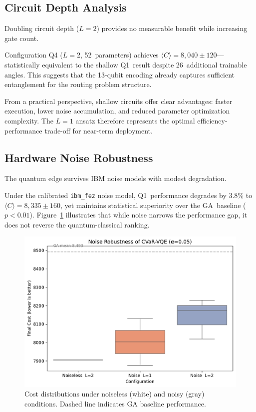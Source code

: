 \subsection{Circuit Depth Analysis}

Doubling circuit depth ($L=2$) provides no measurable benefit while increasing 
gate count.


Configuration Q4 ($L=2$, 52~parameters) achieves $\langle C\rangle=8{,}040\pm120$—statistically 
equivalent to the shallow Q1~result despite 26~additional trainable angles. 
This suggests that the 13-qubit encoding already captures sufficient entanglement 
for the routing problem structure.

From a practical perspective, shallow circuits offer clear advantages: faster 
execution, lower noise accumulation, and reduced parameter optimization complexity. 
The $L=1$ ansatz therefore represents the optimal efficiency-performance trade-off 
for near-term deployment.

\subsection{Hardware Noise Robustness}

The quantum edge survives IBM noise models with modest degradation.

Under the calibrated \texttt{ibm\_fez} noise model, Q1~performance degrades by 
3.8\% to $\langle C\rangle=8{,}335\pm160$, yet maintains statistical superiority 
over the GA~baseline ($p<0.01$). Figure~\ref{fig:noise} illustrates that while 
noise narrows the performance gap, it does not reverse the quantum-classical ranking.

\begin{figure}[h]
  \centering
  \includegraphics[width=.7\linewidth]{fig/noise_boxplot.pdf}
  \caption{Cost distributions under noiseless (white) and noisy (gray) conditions. 
           Dashed line indicates GA baseline performance.}
  \label{fig:noise}
\end{figure}

